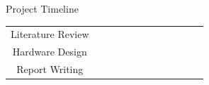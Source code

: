\documentclass[aspectratio=169]{beamer}
\begin{document}
\begin{frame}{Project Timeline}
\begin{table}[]
\begin{tabular}{|c|l|l|l|l|l|l|l|l|l|l|l}
		Literature Review                       & \cellcolor[HTML]{1AEFB2}                                                             & \cellcolor[HTML]{1AEFB2}                                                              & \cellcolor[HTML]{1AEFB2}                                                              & \cellcolor[HTML]{1AEFB2}                                                              & \cellcolor[HTML]{1AEFB2}                                                             & \cellcolor[HTML]{1AEFB2}                                                              & \cellcolor[HTML]{FFFFFF}                                                              &                                                                                       &                                                                                      &                                                                                       &                      \\ \cline{1-11}
		Hardware Design                         &                                                                                      &                                                                                       & \cellcolor[HTML]{1AEFB2}                                                              & \cellcolor[HTML]{1AEFB2}                                                              & \cellcolor[HTML]{1AEFB2}                                                             & \cellcolor[HTML]{1AEFB2}                                                              & \cellcolor[HTML]{1AEFB2}                                                              & \cellcolor[HTML]{1AEFB2}                                                              &                                                                                      &                                                                                       &                      \\ \cline{1-11}
		Report Writing                          &                                                                                      &                                                                                       &                                                                                       &                                                                                       &                                                                                      &                                                                                       & \cellcolor[HTML]{1AEFB2}                                                              & \cellcolor[HTML]{1AEFB2}                                                              & \cellcolor[HTML]{1AEFB2}                                                             & \cellcolor[HTML]{1AEFB2}                                                              &                      \\ \cline{1-11}

\end{tabular}
\end{table}
\end{frame}
\end{document}
